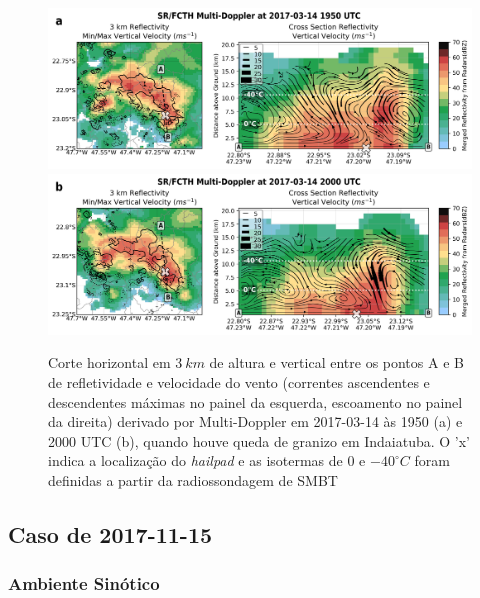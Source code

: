 \begin{figure}[hbt]
	\centering
	\caption{Corte horizontal em $3\:km$ de altura e vertical entre os pontos A e B de refletividade e velocidade do vento (correntes ascendentes e descendentes máximas no painel da esquerda, escoamento no painel da direita) derivado por Multi-Doppler em 2017-03-14 às 1950 (a) e 2000 UTC (b), quando houve queda de granizo em Indaiatuba. O 'x' indica a localização do \textit{hailpad} e as isotermas de $0$ e $-40^{\circ}C$ foram definidas a partir da radiossondagem de SMBT} 
	\label{doppler_20170314_2}
	\vspace{-5pt}
	\includegraphics[width=\columnwidth]{../MultiDoppler_Processing/figures/SR-FCTH 2017-03-14 1950 UTC.png} \\
	\vspace{-5pt}
	\includegraphics[width=\columnwidth]{../MultiDoppler_Processing/figures/SR-FCTH 2017-03-14 2000 UTC.png} \\
\end{figure}

\subsection{Caso de 2017-11-15}

\subsubsection{Ambiente Sinótico}\label{sinotica_20171115}

